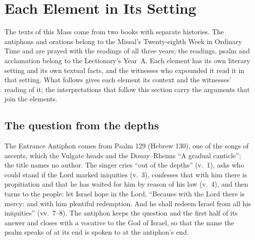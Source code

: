 \section{Each Element in Its Setting}
\label{sec:each-element}

The texts of this Mass come from two books with separate histories. The
antiphons and orations belong to the Missal's Twenty-eighth Week in Ordinary
Time and are prayed with the readings of all three years; the readings, psalm
and acclamation belong to the Lectionary's Year~A. Each element has its own
literary setting and its own textual facts, and the witnesses who expounded it
read it in that setting. What follows gives each element its context and the
witnesses' reading of it; the interpretations that follow this section carry
the arguments that join the elements.

\subsection{The question from the depths}

The Entrance Antiphon comes from Psalm 129 (Hebrew 130), one of the songs of
ascents, which the Vulgate heads  and the
Douay--Rheims ``A gradual canticle''; the title names no author. The singer
cries ``out of the depths'' (v.~1), asks who could stand if the Lord marked
iniquities (v.~3), confesses that with him there is propitiation and that he
has waited for him by reason of his law (v.~4), and then turns to the people:
let Israel hope in the Lord, ``Because with the Lord there is mercy: and with
him plentiful redemption. And he shall redeem Israel from all his iniquities''
(vv.~7--8). The antiphon keeps the question and the first half of its answer
and closes with a vocative to the God of Israel, so that the name the psalm
speaks of at its end is spoken to at the antiphon's end.

